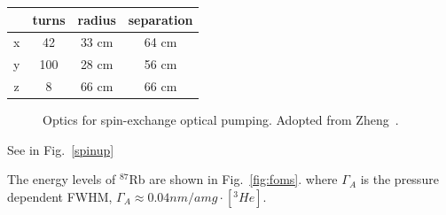 \documentclass[pdftex,letterpaper,12pt]{report}
\begin{document}
\begin{center}
	\begin{tabular}{ | c | c| c| c | }
		\hline
		& turns & radius & separation \\ \hline
		x & 42 & 33 cm & 64 cm \\ \hline 
		y & 100 & 28 cm & 56 cm \\ \hline
		z & 8 & 66 cm & 66 cm \\
		\hline
	\end{tabular}
\end{center}

\begin{figure}[t!]
	\centering
	\caption{{Optics for spin-exchange optical pumping. Adopted from Zheng~\cite{YuanThesis}.}}
	\label{optics}
\end{figure}

See in Fig.~\ref{spinup}


	
The energy levels of $^{87}$Rb are shown in Fig.~\ref{fig:foms}.
where $\Gamma_{A}$ is the pressure dependent FWHM, $\Gamma_{A}\approx 0.04nm/amg \cdot [^{3}He]$.


\end{document}
